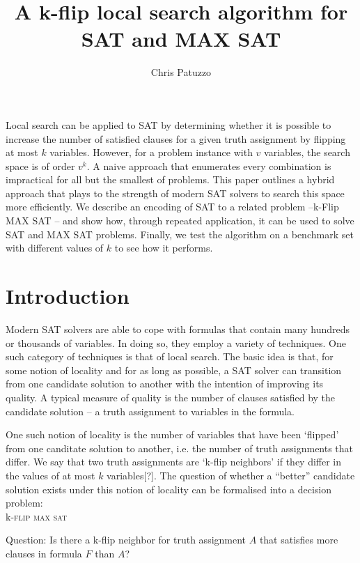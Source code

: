 \documentclass{article}
\begin{document}
\title{A k-flip local search algorithm for SAT and MAX SAT}
\author{Chris Patuzzo}
\maketitle

\abstract
Local search can be applied to SAT by determining whether it is possible to
increase the number of satisfied clauses for a given truth assignment by
flipping at most $k$ variables. However, for a problem instance with $v$
variables, the search space is of order $v^k$. A naive approach that enumerates
every combination is impractical for all but the smallest of problems. This
paper outlines a hybrid approach that plays to the strength of modern SAT
solvers to search this space more efficiently. We describe an encoding of SAT
to a related problem –\linebreak k-Flip MAX SAT – and show how, through repeated
application, it can be used to solve SAT and MAX SAT problems. Finally, we test
the algorithm on a benchmark set with different values of $k$ to see how it
performs.

\section{Introduction}

Modern SAT solvers are able to cope with formulas that contain many hundreds or
thousands of variables. In doing so, they employ a variety of techniques. One
such category of techniques is that of local search. The basic idea is that,
for some notion of locality and for as long as possible, a SAT solver can
transition from one candidate solution to another with the intention of
improving its quality. A typical measure of quality is the number of clauses
satisfied by the candidate solution – a truth assignment to variables in the
formula.

One such notion of locality is the number of variables that have been ‘flipped’
from one canditate solution to another, i.e. the number of truth assignments
that differ. We say that two truth assignments are ‘k-flip neighbors’ if they
differ in the values of at most $k$ variables[?]. The question of whether a
“better” candidate solution exists under this notion of locality can be
formalised into a decision problem:\\

k-\textsc{flip max sat}

Question: Is there a k-flip neighbor for truth assignment $A$ that satisfies
more clauses in formula $F$ than $A$? \\
\end{document}
